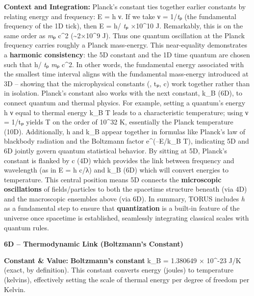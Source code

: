 \documentclass[
]{article}
\begin{document}
\textbf{Context and Integration:} Planck's constant ties together
earlier constants by relating energy and frequency: E = h ν. If we take
ν = 1/\emph{t}ₚ (the fundamental frequency of the 1D tick), then E = h/
\emph{t}ₚ ×10\^{}10 J\hspace{0pt}. Remarkably, this is on the same
order as \emph{m}ₚ c\^{}2 (\textasciitilde2×10\^{}9 J)\hspace{0pt}. Thus
one quantum oscillation at the Planck frequency carries roughly a Planck
mass-energy. This near-equality demonstrates a \textbf{harmonic
consistency}: the 5D constant and the 1D time quantum are chosen such
that h/ \emph{t}ₚ \approx \emph{m}ₚ c\^{}2\hspace{0pt}. In other words, the
fundamental energy associated with the smallest time interval aligns
with the fundamental mass-energy introduced at 3D -- showing that the
microphysical constants (\hbar, tₚ, c) work together rather than in
isolation. Planck's constant also works with the next constant, k\_B
(6D), to connect quantum and thermal physics. For example, setting a
quantum's energy h ν equal to thermal energy k\_B T leads to a
characteristic temperature; using ν = 1/tₚ yields T on the order of
10\^{}32 K, essentially the Planck temperature (10D)\hspace{0pt}.
Additionally, h and k\_B appear together in formulas like Planck's law
of blackbody radiation and the Boltzmann factor e\^{}(--E/k\_B T),
indicating 5D and 6D jointly govern quantum statistical behavior. By
sitting at 5D, Planck's constant is flanked by c (4D) which provides the
link between frequency and wavelength (as in E = h c/λ) and k\_B (6D)
which will convert energies to temperature\hspace{0pt}. This central
position means 5D connects the \textbf{microscopic oscillations} of
fields/particles to both the spacetime structure beneath (via 4D) and
the macroscopic ensembles above (via 6D). In summary, TORUS includes
\emph{h} as a fundamental step to ensure that \textbf{quantization} is a
built-in feature of the universe once spacetime is established,
seamlessly integrating classical scales with quantum rules.

\textbf{6D -- Thermodynamic Link (Boltzmann's Constant)}

\textbf{Constant \& Value:} \textbf{Boltzmann's constant} k\_B =
1.380649 × 10\^{}-23 J/K (exact, by definition)\hspace{0pt}. This
constant converts energy (joules) to temperature (kelvins), effectively
setting the scale of thermal energy per degree of freedom per Kelvin.
\end{document}
